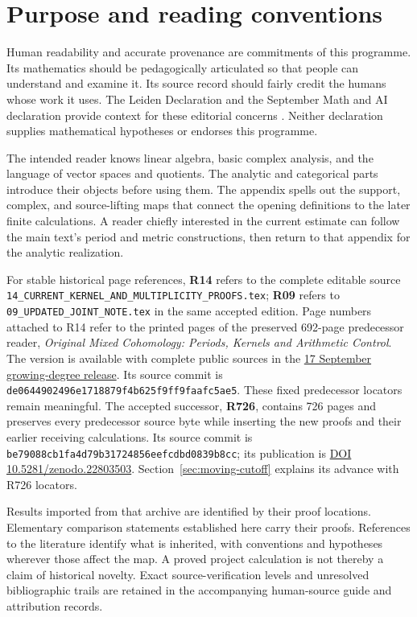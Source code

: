 \section*{Purpose and reading conventions}
Human readability and accurate provenance are commitments of this
programme. Its mathematics should be pedagogically articulated so that people
can understand and examine it. Its source record should fairly credit the
humans whose work it uses. The Leiden Declaration and the September
Math and AI declaration provide context for these editorial concerns
\citep{AlperEtAl2026Leiden,AvilaEtAl2026Misalignment}.
Neither declaration supplies mathematical hypotheses or endorses this programme.

The intended reader knows linear algebra, basic complex analysis, and the
language of vector spaces and quotients. The analytic and categorical parts
introduce their objects before using them. The appendix spells out the
support, complex, and source-lifting maps that connect the opening definitions
to the later finite calculations. A reader chiefly interested in the current
estimate can follow the main text's period and metric constructions, then
return to that appendix for the analytic realization.

For stable historical page references, \textbf{R14} refers to the complete editable source
\nolinkurl{14_CURRENT_KERNEL_AND_MULTIPLICITY_PROOFS.tex};
\textbf{R09} refers to \nolinkurl{09_UPDATED_JOINT_NOTE.tex} in the same
accepted edition. Page numbers attached to R14 refer to the printed pages of
the preserved 692-page predecessor reader, \emph{Original Mixed Cohomology: Periods, Kernels and
Arithmetic Control}. The version is available with complete public sources in
the \href{https://github.com/KokunoYumeto/zeta-function-research-reader/releases/tag/rgc-growing-degree-2026-09-17-de064490}{17 September growing-degree release}.
Its source commit is \texttt{de0644902496e1718879f4b625f9ff9faafc5ae5}.
These fixed predecessor locators remain meaningful. The accepted successor,
\textbf{R726}, contains 726 pages and preserves every predecessor source byte
while inserting the new proofs and their earlier receiving calculations.
Its source commit is \texttt{be79088cb1fa4d79b31724856eefcdbd0839b8cc};
its publication is \href{https://doi.org/10.5281/zenodo.22803503}{DOI 10.5281/zenodo.22803503}.
Section~\ref{sec:moving-cutoff} explains its advance with R726 locators.

Results imported from that archive are identified by their proof locations.
Elementary comparison statements established here carry their proofs.
References to the literature identify what is inherited, with conventions and
hypotheses wherever those affect the map. A proved project calculation is not
thereby a claim of historical novelty. Exact source-verification levels and
unresolved bibliographic trails are retained in the accompanying human-source
guide and attribution records.

